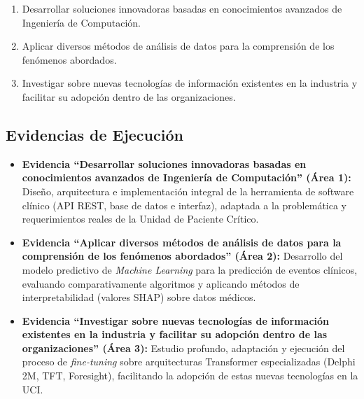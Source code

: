 \documentclass[11pt,a4paper]{article}
\begin{document}
\begin{enumerate}
    \item Desarrollar soluciones innovadoras basadas en conocimientos avanzados de Ingeniería de
    Computación.
    \item Aplicar diversos métodos de análisis de datos para la comprensión de los fenómenos abordados.
    \item Investigar sobre nuevas tecnologías de información existentes en la industria y facilitar
    su adopción dentro de las organizaciones.
\end{enumerate}

\subsection*{Evidencias de Ejecución}
\begin{itemize}
    \item \textbf{Evidencia ``Desarrollar soluciones innovadoras basadas en conocimientos avanzados de Ingeniería de Computación'' (Área 1):} Diseño, arquitectura e implementación
    integral de la herramienta de software clínico (API REST, base de datos e interfaz),
    adaptada a la problemática y requerimientos reales de la Unidad de Paciente Crítico.

    \item \textbf{Evidencia ``Aplicar diversos métodos de análisis de datos para la comprensión de los fenómenos abordados'' (Área 2):} Desarrollo del modelo predictivo de
    \textit{Machine Learning} para la predicción de eventos clínicos, evaluando comparativamente
    algoritmos y aplicando métodos de interpretabilidad (valores SHAP) sobre datos médicos.

    \item \textbf{Evidencia ``Investigar sobre nuevas tecnologías de información existentes en la industria y facilitar su adopción dentro de las organizaciones'' (Área 3):} Estudio profundo, adaptación y ejecución
    del proceso de \textit{fine-tuning} sobre arquitecturas Transformer especializadas
    (Delphi 2M, TFT, Foresight), facilitando la adopción de estas nuevas tecnologías en la UCI.
\end{itemize}
\end{document}
